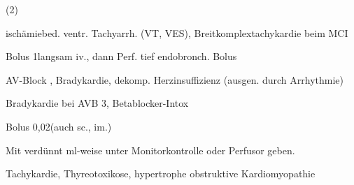 
{
\begin{MedikamentCharakteristika}
  \item[{\TxItemSpezialitaeten}] (2\PC*)
  \item[{\TxItemIndikation}] ischämiebed. ventr. Tachyarrh. (VT, VES),
  Breitkomplextachykardie beim MCI
  \item[{\TxItemDosierung}] Bolus 1\MgKg* langsam iv., dann Perf.
  \MgKgH\newline
  tief endobronch. Bolus \MgKg*
  \item[{\TxItemKontraindikation}] AV-Block 
  , Bradykardie, dekomp.
  Herzinsuffizienz (ausgen. durch Arrhythmie)
  \begin{Synopsis}
  \end{Synopsis}
\end{MedikamentCharakteristika}}
{}





{}
{}


{
\begin{MedikamentCharakteristika}
  \item[{\TxItemSpezialitaeten}] 
  \item[{\TxItemIndikation}] Bradykardie bei AVB 3{\textdegree}, 
  Betablocker-Intox
  \item[{\TxItemDosierung}] Bolus 0,02\MgKg* (auch sc., im.)

  Mit  verdünnt ml-weise unter Monitorkontrolle oder 
  Perfusor geben.
  \item[{\TxItemKontraindikation}] Tachykardie, Thyreotoxikose, 
  hypertrophe obstruktive Kardiomyopathie
\end{MedikamentCharakteristika}}
{}


